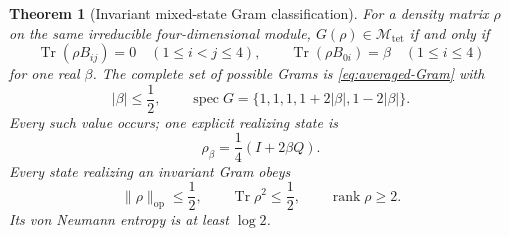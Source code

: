 \documentclass[11pt]{article}
\newtheorem{theorem}{Theorem}[section]
\theoremstyle{definition}
\theoremstyle{remark}
\newcommand{\Tr}{\operatorname{Tr}}
\newcommand{\rank}{\operatorname{rank}}
\newcommand{\spec}{\operatorname{spec}}
\newcommand{\op}{\mathrm{op}}
\newcommand{\norm}[1]{\lVert#1\rVert}
\newcommand{\Mtet}{\mathscr M_{\mathrm{tet}}}
\begin{document}
\begin{theorem}[Invariant mixed-state Gram classification]
\label{thm:mixed-classification}
For a density matrix $\rho$ on the same irreducible four-dimensional module,
$G(\rho)\in\Mtet$ if and only if
\begin{equation}
 \Tr(\rho B_{ij})=0\quad(1\le i<j\le4),\qquad
 \Tr(\rho B_{0i})=\beta\quad(1\le i\le4)
 \label{eq:mixed-conditions}
\end{equation}
for one real $\beta$. The complete set of possible Grams is
\eqref{eq:averaged-Gram} with
\begin{equation}
 |\beta|\le\frac12,
 \qquad
 \spec G=\{1,1,1,1+2|\beta|,1-2|\beta|\}.
 \label{eq:mixed-spectrum}
\end{equation}
Every such value occurs; one explicit realizing state is
\begin{equation}
 \rho_\beta=\frac14(I+2\beta Q).
 \label{eq:rhobeta}
\end{equation}
Every state realizing an invariant Gram obeys
\begin{equation}
 \boxed{\norm\rho_{\op}\le\frac12,\qquad
        \Tr\rho^2\le\frac12,\qquad \rank\rho\ge2.}
 \label{eq:purity-cost}
\end{equation}
Its von Neumann entropy is at least $\log2$.
\end{theorem}
\end{document}
